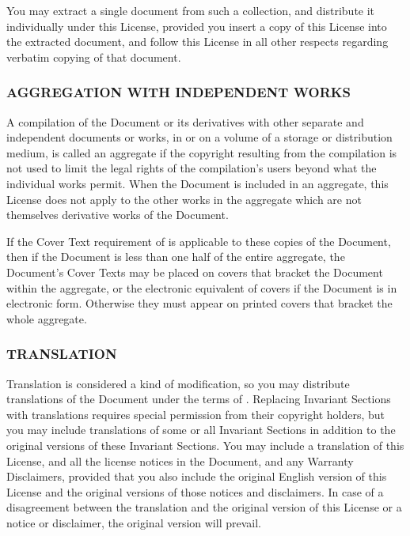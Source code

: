 \documentclass[10pt,english]{article}
\begin{document}
You may extract a single document from such a collection, and distribute
it individually under this License, provided you insert a copy of
this License into the extracted document, and follow this License
in all other respects regarding verbatim copying of that document.


\subsubsection{AGGREGATION WITH INDEPENDENT WORKS}

A compilation of the Document or its derivatives with other separate
and independent documents or works, in or on a volume of a storage
or distribution medium, is called an \textquotedbl{}aggregate\textquotedbl{}
if the copyright resulting from the compilation is not used to limit
the legal rights of the compilation's users beyond what the individual
works permit. When the Document is included in an aggregate, this
License does not apply to the other works in the aggregate which are
not themselves derivative works of the Document.

If the Cover Text requirement of 
is applicable to these copies of the Document, then if the Document
is less than one half of the entire aggregate, the Document's Cover
Texts may be placed on covers that bracket the Document within the
aggregate, or the electronic equivalent of covers if the Document
is in electronic form. Otherwise they must appear on printed covers
that bracket the whole aggregate.


\subsubsection{TRANSLATION}

Translation is considered a kind of modification, so you may distribute
translations of the Document under the terms of .
Replacing Invariant Sections with translations requires special permission
from their copyright holders, but you may include translations of
some or all Invariant Sections in addition to the original versions
of these Invariant Sections. You may include a translation of this
License, and all the license notices in the Document, and any Warranty
Disclaimers, provided that you also include the original English version
of this License and the original versions of those notices and disclaimers.
In case of a disagreement between the translation and the original
version of this License or a notice or disclaimer, the original version
will prevail.
\end{document}

